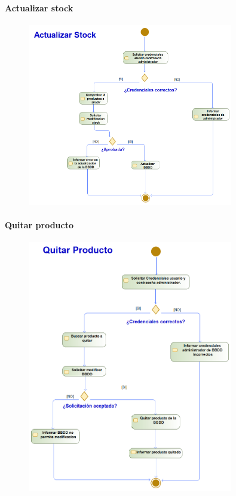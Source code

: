 \paragraph{Actualizar stock}
\begin{figure}[H]
    \centering
    \includegraphics[width=0.8\textwidth]{Use_Cases/ProyectoIS_ActualizarStock.png}
\end{figure}
\paragraph{Quitar producto}
\begin{figure}[H]
    \centering
    \includegraphics[width=0.8\textwidth]{Use_Cases/ProyectoIS_QuitarProducto.png}
\end{figure}

